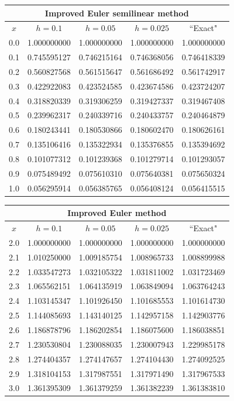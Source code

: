 \documentclass[dvips]{book}
\renewcommand{\exer}[1]{\par\medskip\;\noindent{\color{red}\bf #1.}}
\numberwithin{example}{section}
\numberwithin{equation}{section}
\numberwithin{theorem}{section}
\numberwithin{table}{section}
\numberwithin{figure}{section}
\begin{document}
{\small
\begin{tabular}{|c|r|r|r|r|}
\hline
\multicolumn{5}{|c|}{Improved Euler semilinear method}\\\hline
\multicolumn{1}{|c|}{$x$}&
\multicolumn{1}{|c|}{$h=0.1$}&
\multicolumn{1}{|c|}{$h=0.05$}&
\multicolumn{1}{|c|}{$h=0.025$}&
\multicolumn{1}{|c|}{``Exact"}\\ \hline
0.0 & 1.000000000 & 1.000000000 & 1.000000000 & 1.000000000 \\
0.1 & 0.745595127 & 0.746215164 & 0.746368056 & 0.746418339 \\
0.2 & 0.560827568 & 0.561515647 & 0.561686492 & 0.561742917 \\
0.3 & 0.422922083 & 0.423524585 & 0.423674586 & 0.423724207 \\
0.4 & 0.318820339 & 0.319306259 & 0.319427337 & 0.319467408 \\
0.5 & 0.239962317 & 0.240339716 & 0.240433757 & 0.240464879 \\
0.6 & 0.180243441 & 0.180530866 & 0.180602470 & 0.180626161 \\
0.7 & 0.135106416 & 0.135322934 & 0.135376855 & 0.135394692 \\
0.8 & 0.101077312 & 0.101239368 & 0.101279714 & 0.101293057 \\
0.9 & 0.075489492 & 0.075610310 & 0.075640381 & 0.075650324 \\
1.0 & 0.056295914 & 0.056385765 & 0.056408124 & 0.056415515 \\
\hline
\end{tabular}}

\exer{3.2.22}
{\small
\begin{tabular}{|c|r|r|r|r|}
\hline
\multicolumn{5}{|c|}{Improved Euler method}\\\hline
\multicolumn{1}{|c|}{$x$}&
\multicolumn{1}{|c|}{$h=0.1$}&
\multicolumn{1}{|c|}{$h=0.05$}&
\multicolumn{1}{|c|}{$h=0.025$}&
\multicolumn{1}{|c|}{``Exact"}\\ \hline
2.0 & 1.000000000 & 1.000000000 & 1.000000000 & 1.000000000 \\
2.1 & 1.010250000 & 1.009185754 & 1.008965733 & 1.008899988 \\
2.2 & 1.033547273 & 1.032105322 & 1.031811002 & 1.031723469 \\
2.3 & 1.065562151 & 1.064135919 & 1.063849094 & 1.063764243 \\
2.4 & 1.103145347 & 1.101926450 & 1.101685553 & 1.101614730 \\
2.5 & 1.144085693 & 1.143140125 & 1.142957158 & 1.142903776 \\
2.6 & 1.186878796 & 1.186202854 & 1.186075600 & 1.186038851 \\
2.7 & 1.230530804 & 1.230088035 & 1.230007943 & 1.229985178 \\
2.8 & 1.274404357 & 1.274147657 & 1.274104430 & 1.274092525 \\
2.9 & 1.318104153 & 1.317987551 & 1.317971490 & 1.317967533 \\
3.0 & 1.361395309 & 1.361379259 & 1.361382239 & 1.361383810 \\
\hline
\end{tabular}}
\medskip
\end{document}
